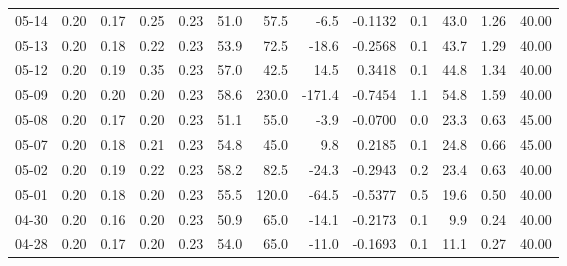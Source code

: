 \begin{threeparttable}
{\begin{tabular}{lrrrrrrrrrrrr}
  05-14 &          0.20 &          0.17 &          0.25 &        0.23 &                51.0 &                57.5 &       -6.5 &      -0.1132 &                 0.1 &             43.0 &            1.26 &                  40.00 \\
  05-13 &          0.20 &          0.18 &          0.22 &        0.23 &                53.9 &                72.5 &      -18.6 &      -0.2568 &                 0.1 &             43.7 &            1.29 &                  40.00 \\
  05-12 &          0.20 &          0.19 &          0.35 &        0.23 &                57.0 &                42.5 &       14.5 &       0.3418 &                 0.1 &             44.8 &            1.34 &                  40.00 \\
  05-09 &          0.20 &          0.20 &          0.20 &        0.23 &                58.6 &               230.0 &     -171.4 &      -0.7454 &                 1.1 &             54.8 &            1.59 &                  40.00 \\
  05-08 &          0.20 &          0.17 &          0.20 &        0.23 &                51.1 &                55.0 &       -3.9 &      -0.0700 &                 0.0 &             23.3 &            0.63 &                  45.00 \\
  05-07 &          0.20 &          0.18 &          0.21 &        0.23 &                54.8 &                45.0 &        9.8 &       0.2185 &                 0.1 &             24.8 &            0.66 &                  45.00 \\
  05-02 &          0.20 &          0.19 &          0.22 &        0.23 &                58.2 &                82.5 &      -24.3 &      -0.2943 &                 0.2 &             23.4 &            0.63 &                  40.00 \\
  05-01 &          0.20 &          0.18 &          0.20 &        0.23 &                55.5 &               120.0 &      -64.5 &      -0.5377 &                 0.5 &             19.6 &            0.50 &                  40.00 \\
  04-30 &          0.20 &          0.16 &          0.20 &        0.23 &                50.9 &                65.0 &      -14.1 &      -0.2173 &                 0.1 &              9.9 &            0.24 &                  40.00 \\
  04-28 &          0.20 &          0.17 &          0.20 &        0.23 &                54.0 &                65.0 &      -11.0 &      -0.1693 &                 0.1 &             11.1 &            0.27 &                  40.00 \\

\end{tabular}}
\end{threeparttable}
